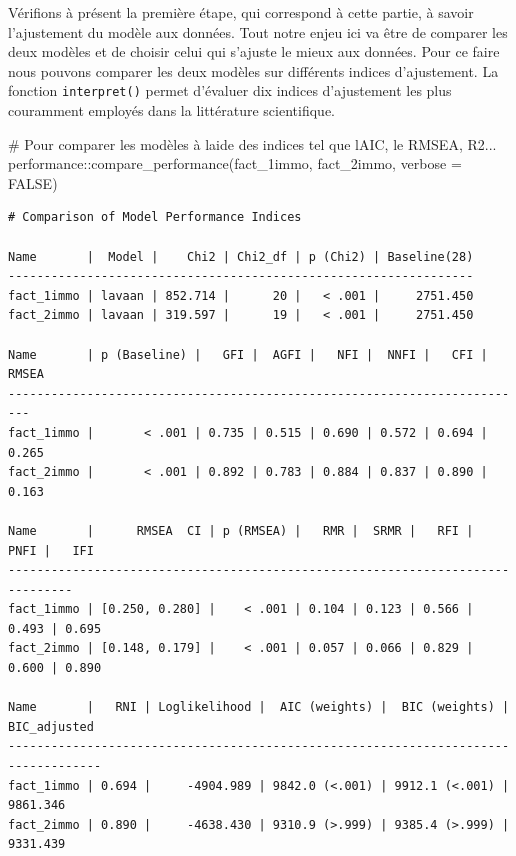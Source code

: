 \documentclass[
  french,
  11pt,
  a4paper,
]{article}
\newenvironment{Shaded}{}{}
\newcommand{\AttributeTok}[1]{\textcolor[rgb]{0.84,0.23,0.29}{#1}}
\newcommand{\CommentTok}[1]{\textcolor[rgb]{0.42,0.45,0.49}{#1}}
\newcommand{\ConstantTok}[1]{\textcolor[rgb]{0.00,0.36,0.77}{#1}}
\newcommand{\FunctionTok}[1]{\textcolor[rgb]{0.44,0.26,0.76}{#1}}
\newcommand{\NormalTok}[1]{\textcolor[rgb]{0.14,0.16,0.18}{#1}}
\newcommand{\SpecialCharTok}[1]{\textcolor[rgb]{0.00,0.36,0.77}{#1}}
\begin{document}
Vérifions à présent la première étape, qui correspond à cette partie, à
savoir l'ajustement du modèle aux données. Tout notre enjeu ici va être
de comparer les deux modèles et de choisir celui qui s'ajuste le mieux
aux données. Pour ce faire nous pouvons comparer les deux modèles sur
différents indices d'ajustement. La fonction \texttt{interpret()} permet
d'évaluer dix indices d'ajustement les plus couramment employés dans la
littérature scientifique.

\begin{Shaded}
\begin{Highlighting}[]
\CommentTok{\# Pour comparer les modèles à l\textquotesingle{}aide des indices tel que l\textquotesingle{}AIC, le RMSEA, R2...}
\NormalTok{performance}\SpecialCharTok{::}\FunctionTok{compare\_performance}\NormalTok{(fact\_1immo, fact\_2immo, }\AttributeTok{verbose =} \ConstantTok{FALSE}\NormalTok{)}
\end{Highlighting}
\end{Shaded}

\begin{verbatim}
# Comparison of Model Performance Indices

Name       |  Model |    Chi2 | Chi2_df | p (Chi2) | Baseline(28)
-----------------------------------------------------------------
fact_1immo | lavaan | 852.714 |      20 |   < .001 |     2751.450
fact_2immo | lavaan | 319.597 |      19 |   < .001 |     2751.450

Name       | p (Baseline) |   GFI |  AGFI |   NFI |  NNFI |   CFI | RMSEA
-------------------------------------------------------------------------
fact_1immo |       < .001 | 0.735 | 0.515 | 0.690 | 0.572 | 0.694 | 0.265
fact_2immo |       < .001 | 0.892 | 0.783 | 0.884 | 0.837 | 0.890 | 0.163

Name       |      RMSEA  CI | p (RMSEA) |   RMR |  SRMR |   RFI |  PNFI |   IFI
-------------------------------------------------------------------------------
fact_1immo | [0.250, 0.280] |    < .001 | 0.104 | 0.123 | 0.566 | 0.493 | 0.695
fact_2immo | [0.148, 0.179] |    < .001 | 0.057 | 0.066 | 0.829 | 0.600 | 0.890

Name       |   RNI | Loglikelihood |  AIC (weights) |  BIC (weights) | BIC_adjusted
-----------------------------------------------------------------------------------
fact_1immo | 0.694 |     -4904.989 | 9842.0 (<.001) | 9912.1 (<.001) |     9861.346
fact_2immo | 0.890 |     -4638.430 | 9310.9 (>.999) | 9385.4 (>.999) |     9331.439
\end{verbatim}
\end{document}
